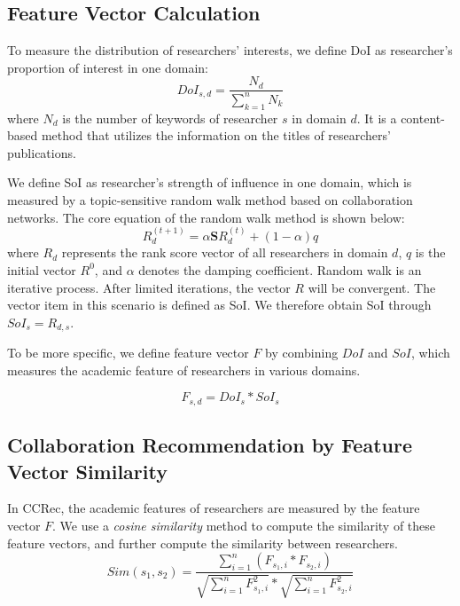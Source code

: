 \documentclass{acm_proc_article-sp}
\begin{document}
\subsection{Feature Vector Calculation}
To measure the distribution of researchers' interests, we define DoI as researcher's proportion of interest in one domain:
\begin{equation}
DoI_{s,d}=\frac{N_{d}}{\sum_{k=1}^{n} N_{k}}
\end{equation}
where $N_{d}$ is the number of keywords of researcher $s$ in domain $d$. It is a content-based method that utilizes the information on the titles of researchers' publications.

We define SoI as researcher's strength of influence in one domain, which is measured by a topic-sensitive random walk method based on collaboration networks. The core equation of the random walk method is shown below:
\begin{equation}
R_{d}^{(t+1)}=\alpha \mathbf{S}R_{d}^{(t)}+(1-\alpha)q
\end{equation}
where $R_{d}$ represents the rank score vector of all researchers in domain $d$, $q$ is the initial vector $R^0$, and $\alpha$ denotes the damping coefficient. Random walk is an iterative process. After limited iterations, the vector $R$ will be convergent. The vector item in this scenario is defined as SoI. We therefore obtain SoI through $SoI_{s}=R_{d,s}$.

To be more specific, we define feature vector $F$ by combining $DoI$ and $SoI$, which measures the academic feature of researchers in various domains.

\begin{equation}
F_{s,d}=DoI_{s}*SoI_{s}
\end{equation}

\subsection{Collaboration Recommendation by Feature Vector Similarity}
In CCRec, the academic features of researchers are measured by the feature vector $F$. We use a \emph{cosine similarity} method to compute the similarity of these feature vectors, and further compute the similarity between researchers.
\begin{equation}
Sim(s_{1},s_{2})=\frac{\sum_{i=1}^{n}(F_{s_{1},i}*F_{s_{2},i})}{\sqrt{\sum_{i=1}^{n}F_{s_{1},i}^2}*\sqrt{\sum_{i=1}^{n}F_{s_{2},i}^2}}
\end{equation}
\end{document}
